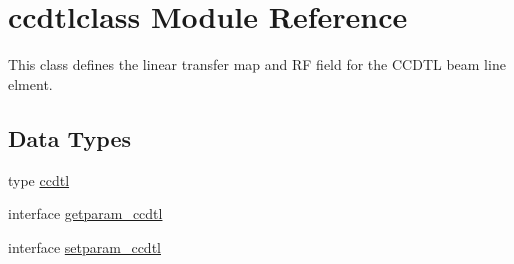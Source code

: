 \hypertarget{namespaceccdtlclass}{}\section{ccdtlclass Module Reference}
\label{namespaceccdtlclass}


This class defines the linear transfer map and RF field for the C\+C\+D\+TL beam line elment.  


\subsection*{Data Types}
\begin{DoxyCompactItemize}
\item 
type \mbox{\hyperlink{namespaceccdtlclass_structccdtlclass_1_1ccdtl}{ccdtl}}
\item 
interface \mbox{\hyperlink{interfaceccdtlclass_1_1getparam__ccdtl}{getparam\+\_\+ccdtl}}
\item 
interface \mbox{\hyperlink{interfaceccdtlclass_1_1setparam__ccdtl}{setparam\+\_\+ccdtl}}
\end{DoxyCompactItemize}
